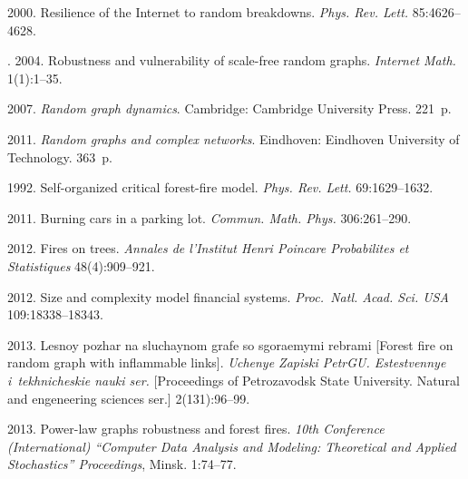   \begin{multicols}{2}

\renewcommand{\bibname}{\protect\rmfamily References}

{\small\frenchspacing
 {%
 \begin{thebibliography}{99}
 
 2000.
Resilience of the Internet to random breakdowns. \textit{Phys. Rev. Lett.}
85:4626--4628.

. 2004. Robustness and vulnerability
of scale-free random graphs. \textit{Internet Math.} 1(1):1--35.



 2007. \textit{Random graph dynamics}.
Cambridge: Cambridge University Press.  221~p.

 2011. \textit{Random graphs and complex networks}.
Eindhoven: Eindhoven University of Technology. 363~p.

 1992. Self-organized critical forest-fire
model. \textit{Phys. Rev. Lett.} 69:1629--1632.


 2011. Burning cars in a parking lot. \textit{Commun. Math.
Phys.} 306:261--290.

 2012. Fires on trees. \textit{Annales de l'Institut Henri
Poincare Probabilites et Statistiques} 48(4):909--921.

 2012. Size and complexity
model financial systems. \textit{Proc.\ Natl. Acad. Sci. USA} 109:18338--18343.

 2013. Lesnoy pozhar na sluchaynom grafe
so sgoraemymi rebrami [Forest fire on random graph with inflammable links].
\textit{Uchenye Zapiski PetrGU. Estestvennye i~tekhnicheskie nauki ser.}
[Proceedings of Petrozavodsk State University. Natural and engeneering sciences ser.]
2(131):96--99.

 2013. Power-law graphs robustness and forest
fires. \textit{10th  Conference (International) ``Computer Data Analysis
and Modeling: Theoretical and Applied Stochastics'' Proceedings}, Minsk. 1:74--77.


\end{thebibliography}}}
\end{multicols}
